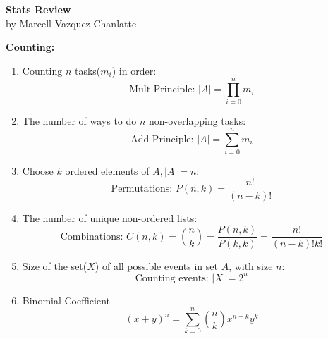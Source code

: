 \documentclass[12pt]{article}
\newcommand{\abs}[1]{\left| #1 \right|} %
\renewcommand{\=}[1]{\stackrel{#1}{=}} %
\theoremstyle{definition}
\theoremstyle{remark}
\begin{document}
\begin{center}
  {\LARGE
    \textbf{Stats Review}\\
    \normalsize
    \textnormal {by Marcell Vazquez-Chanlatte}
    \\[1ex]}

  
\end{center}

\textbf{Counting:}
\begin{enumerate}
\item Counting $n$ tasks($m_i$) in order:
  \begin{equation}
    \textrm{Mult Principle:  } \abs{A}= \displaystyle\prod_{i = 0}^{n}m_i
  \end{equation}
\item The number of ways to do $n$ non-overlapping tasks:
  \begin{equation}
    \textrm{Add Principle: } \abs{A} = \sum_{i=0}^n m_i
  \end{equation}
\item Choose $k$ ordered elements of $A, \abs{A}=
  n$:
  \begin{equation}
    \textrm{Permutations: } P(n,k) = \frac{n!}{(n-k)!} 
  \end{equation}
\item The number of unique non-ordered lists:
  \begin{equation}
    \textrm{Combinations: } C(n,k) = \binom{n}{k} = \frac{P(n,k)}{P(k,k)} =
    \frac{n!}{(n-k)!k!}
  \end{equation}
\item Size of the set($X$) of all possible events in set
  $A$, with size $n$:
  \begin{equation}
    \textrm{Counting events: } \abs{X} = 2^n
  \end{equation}
\item Binomial Coefficient
  \begin{equation}
    (x+y)^n = \sum_{k=0}^n\binom{n}{k}x^{n-k}y^k
  \end{equation}
\end{enumerate}
\end{document}
